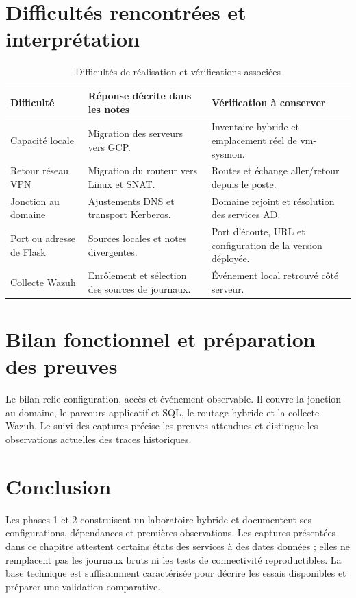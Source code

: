 \documentclass[a4paper,12pt]{report}
\begin{document}
\section{Difficultés rencontrées et interprétation}
\begin{table}[H]\centering\small
\caption{Difficultés de réalisation et vérifications associées}
\begin{tabularx}{\textwidth}{p{3.2cm}YY}\toprule
\textbf{Difficulté} & \textbf{Réponse décrite dans les notes} & \textbf{Vérification à conserver}\\\midrule
Capacité locale & Migration des serveurs vers GCP. & Inventaire hybride et emplacement réel de vm-sysmon.\\
Retour réseau VPN & Migration du routeur vers Linux et SNAT. & Routes et échange aller/retour depuis le poste.\\
Jonction au domaine & Ajustements DNS et transport Kerberos. & Domaine rejoint et résolution des services AD.\\
Port ou adresse de Flask & Sources locales et notes divergentes. & Port d'écoute, URL et configuration de la version déployée.\\
Collecte Wazuh & Enrôlement et sélection des sources de journaux. & Événement local retrouvé côté serveur.\\\bottomrule
\end{tabularx}\end{table}

\section{Bilan fonctionnel et préparation des preuves}
Le bilan relie configuration, accès et événement observable. Il couvre la jonction au domaine, le parcours applicatif et SQL, le routage hybride et la collecte Wazuh. Le suivi des captures précise les preuves attendues et distingue les observations actuelles des traces historiques.

\section*{Conclusion}
Les phases 1 et 2 construisent un laboratoire hybride et documentent ses configurations, dépendances et premières observations. Les captures présentées dans ce chapitre attestent certains états des services à des dates données ; elles ne remplacent pas les journaux bruts ni les tests de connectivité reproductibles. La base technique est suffisamment caractérisée pour décrire les essais disponibles et préparer une validation comparative.
\end{document}
